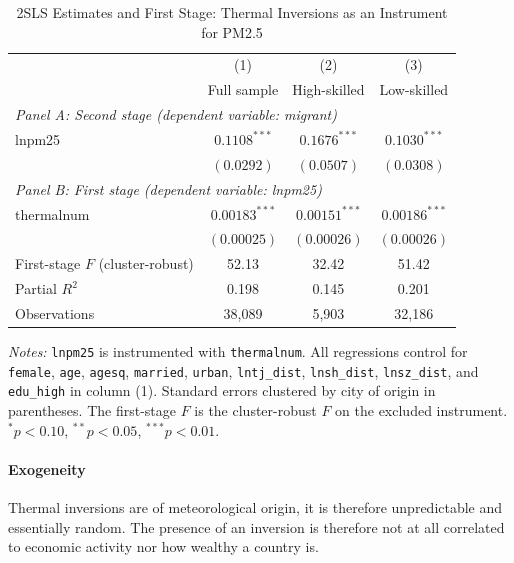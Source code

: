 \documentclass[11pt,twocolumn]{article}
\begin{document}
\begin{table}[!t]
\centering
\begin{threeparttable}
\caption{2SLS Estimates and First Stage: Thermal Inversions as an Instrument for PM2.5}
\label{tab:iv}
\small
\begin{tabular}{lccc}
\toprule
 & (1) & (2) & (3) \\
 & Full sample & High-skilled & Low-skilled \\
\midrule
\multicolumn{4}{l}{\textit{Panel A: Second stage (dependent variable: migrant)}} \\
lnpm25 & $0.1108^{***}$ & $0.1676^{***}$ & $0.1030^{***}$ \\
 & $(0.0292)$ & $(0.0507)$ & $(0.0308)$ \\
\midrule
\multicolumn{4}{l}{\textit{Panel B: First stage (dependent variable: lnpm25)}} \\
thermalnum & $0.00183^{***}$ & $0.00151^{***}$ & $0.00186^{***}$ \\
 & $(0.00025)$ & $(0.00026)$ & $(0.00026)$ \\
First-stage $F$ (cluster-robust) & 52.13 & 32.42 & 51.42 \\
Partial $R^2$ & 0.198 & 0.145 & 0.201 \\
\midrule
Observations & 38,089 & 5,903 & 32,186 \\
\bottomrule
\end{tabular}
\begin{tablenotes}\footnotesize
\item \textit{Notes:} \texttt{lnpm25} is instrumented with \texttt{thermalnum}. All regressions control for \texttt{female}, \texttt{age}, \texttt{agesq}, \texttt{married}, \texttt{urban}, \texttt{lntj\_dist}, \texttt{lnsh\_dist}, \texttt{lnsz\_dist}, and \texttt{edu\_high} in column (1). Standard errors clustered by city of origin in parentheses. The first-stage $F$ is the cluster-robust $F$ on the excluded instrument. $^{*}p<0.10$, $^{**}p<0.05$, $^{***}p<0.01$.
\end{tablenotes}
\end{threeparttable}
\end{table}

\paragraph{Exogeneity}
Thermal inversions are of meteorological origin, it is therefore unpredictable and essentially random. The presence of an inversion is therefore not at all correlated to economic activity nor how wealthy a country is. \\
\end{document}
